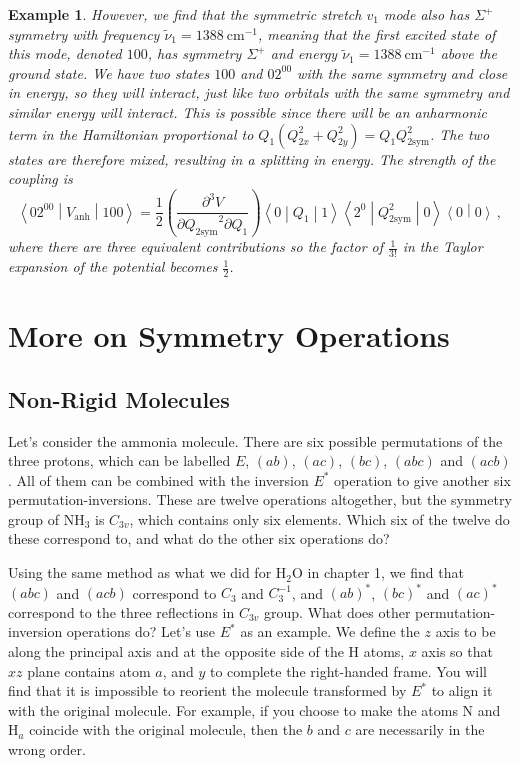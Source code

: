 \documentclass{article}
\theoremstyle{plain}\theoremheaderfont{\normalfont\itshape}\theorembodyfont{\rmfamily}\theoremseparator{.}\newtheorem*{rem}{Remark}\newtheorem*{ex}{Example}\newtheorem*{proof}{Proof}\newtheorem*{altp}{Alternative proof}
\theoremstyle{plain}\theoremheaderfont{\normalfont\bfseries}\theorembodyfont{\rmfamily}\theoremseparator{.}\newtheorem{thm}{Theorem}[section]\newtheorem{lem}[thm]{Lemma}\newtheorem{prop}[thm]{Proposition}\newtheorem*{cor}{Corollary}\newtheorem{defn}[thm]{Definition}\newtheorem{clm}[thm]{Claim}\newtheorem{clminproof}{Claim}\newtheorem*{law}{Law}\newtheorem{pos}[thm]{Postulate}
\theoremstyle{break}\theoremheaderfont{\normalfont\itshape}\theorembodyfont{\rmfamily}\theoremseparator{.\medskip}\newtheorem*{proofskip}{Proof}\newtheorem*{exs}{Examples}\newtheorem*{rems}{Remarks}
\theoremstyle{break}\theoremheaderfont{\normalfont\bfseries}\theorembodyfont{\rmfamily}\theoremseparator{.\medskip}\newtheorem{lemskip}[thm]{Lemma}\newtheorem{defnskip}[thm]{Definition}\newtheorem{propskip}[thm]{Proposition}\newtheorem{thmskip}[thm]{Theorem}
\numberwithin{equation}{section}
\newcommand{\unit}[1]{\ \mathrm{#1}}
\newcommand{\braket}[2]{\left\langle #1 \middle| #2 \right\rangle}
\newcommand{\mel}[3]{\left\langle #1 \middle| #2 \middle| #3 \right\rangle}
\begin{document}
\begin{ex}
        However, we find that the symmetric stretch \(v_1\) mode also has \(\Sigma^+\) symmetry with frequency \(\tilde{\nu}_1=1388\unit{cm}^{-1}\), meaning that the first excited state of this mode, denoted \(100\), has symmetry \(\Sigma^+\) and energy \(\tilde{\nu}_1=1388\unit{cm}^{-1}\) above the ground state. We have two states \(100\) and \(02^00\) with the same symmetry and close in energy, so they will interact, just like two orbitals with the same symmetry and similar energy will interact. This is possible since there will be an anharmonic term in the Hamiltonian proportional to \(Q_1(Q_{2x}^2+Q_{2y}^2)=Q_1Q_{2\text{sym}}^2\). The two states are therefore mixed, resulting in a splitting in energy. The strength of the coupling is
        \begin{equation}
            \mel{02^00}{V_{\text{anh}}}{100}=\frac{1}{2}\left(\frac{\partial^3 V}{{\partial Q_{2\text{sym}}}^2\partial Q_1}\right)\mel{0}{Q_1}{1}\mel{2^0}{Q_{2\text{sym}}^2}{0}\braket{0}{0}\,,
        \end{equation}
        where there are three equivalent contributions so the factor of \(\frac{1}{3!}\) in the Taylor expansion of the potential becomes \(\frac{1}{2}\).
    \end{ex}
    \newpage
    \section{More on Symmetry Operations}
    \subsection{Non-Rigid Molecules}
    Let's consider the ammonia molecule. There are six possible permutations of the three protons, which can be labelled \(E\), \((ab)\), \((ac)\), \((bc)\), \((abc)\) and \((acb)\). All of them can be combined with the inversion \(E^*\) operation to give another six permutation-inversions. These are twelve operations altogether, but the symmetry group of \(\mathrm{NH_3}\) is \(C_{3v}\), which contains only six elements. Which six of the twelve do these correspond to, and what do the other six operations do?

    Using the same method as what we did for \(\mathrm{H_2O}\) in chapter 1, we find that \((abc)\) and \((acb)\) correspond to \(C_3\) and \(C_3^{-1}\), and \((ab)^*\), \((bc)^*\) and \((ac)^*\) correspond to the three reflections in \(C_{3v}\) group. What does other permutation-inversion operations do? Let's use \(E^*\) as an example. We define the \(z\) axis to be along the principal axis and at the opposite side of the \(\mathrm{H}\) atoms, \(x\) axis so that \(xz\) plane contains atom \(a\), and \(y\) to complete the right-handed frame. You will find that it is impossible to reorient the molecule transformed by \(E^*\) to align it with the original molecule. For example, if you choose to make the atoms \(\mathrm{N}\) and \(\mathrm{H}_a\) coincide with the original molecule, then the \(b\) and \(c\) are necessarily in the wrong order.
\end{document}
